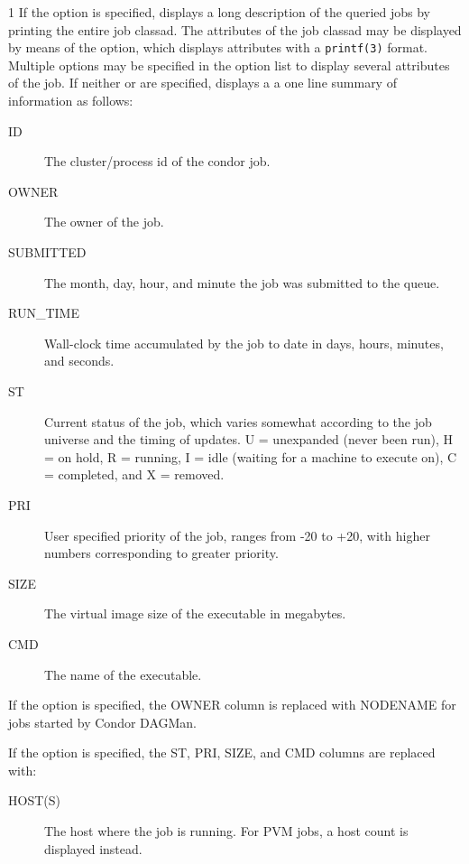 \begin{ManPage}{\label{man-condor-q}}{1}
If the  option is specified,  displays a long description 
of the queried jobs by printing the entire job classad.
The attributes of the job classad may be displayed by means of the
 option, which displays attributes with a \verb+printf(3)+
format.
Multiple  options may be specified in the option list to display
several attributes of the job.
If neither  or  are specified,  displays a 
a one line summary of information as follows:

\begin{description}
\item[ID] The cluster/process id of the condor job. 
\item[OWNER] The owner of the job. 
\item[SUBMITTED] The month, day, hour, and minute the job was submitted to the 
	queue. 
\item[RUN\_TIME]  Wall-clock time accumulated by the job to date in days, 
	hours, minutes, and seconds.  
\item[ST] Current status of the job, which varies somewhat according
        to the job universe and the timing of updates.
        U = unexpanded (never been run), H = on hold,
        R = running,
	I = idle
        (waiting for a machine to execute on), C = completed, 
        and X = removed. 
\item[PRI] User specified priority of the job, ranges from -20 to +20, with 
	higher numbers corresponding to greater priority. 
\item[SIZE] The virtual image size of the executable in megabytes. 
\item[CMD] The name of the executable. 
\end{description}

If the  option is specified, the OWNER column is replaced
with NODENAME for jobs started by Condor DAGMan.


If the  option is specified, the ST, PRI, SIZE, and CMD
columns are replaced with:

\begin{description}
\item[HOST(S)] The host where the job is running.  For PVM jobs, a
host count is displayed instead.
\end{description}


\end{ManPage}
